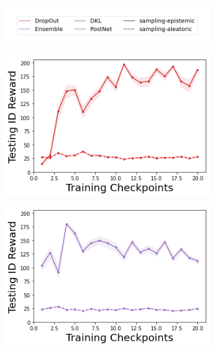 \begin{figure}
    \centering
    \begin{subfigure}{.45\textwidth}
        \includegraphics[width=\textwidth]{sections/011_icml2022/resources/sampling-legend.png}
    \end{subfigure}
    \vspace{-3mm}
    
    \begin{subfigure}{.245\textwidth}
        \includegraphics[width=\textwidth]{sections/011_icml2022/resources/DropOut-CartPole-v0-mean_reward_-testing-strategy.png}
    \end{subfigure}
    \begin{subfigure}{.245\textwidth}
        \includegraphics[width=\textwidth]{sections/011_icml2022/resources/Ensemble-CartPole-v0-mean_reward_-testing-strategy.png}

\end{subfigure}
\end{figure}
